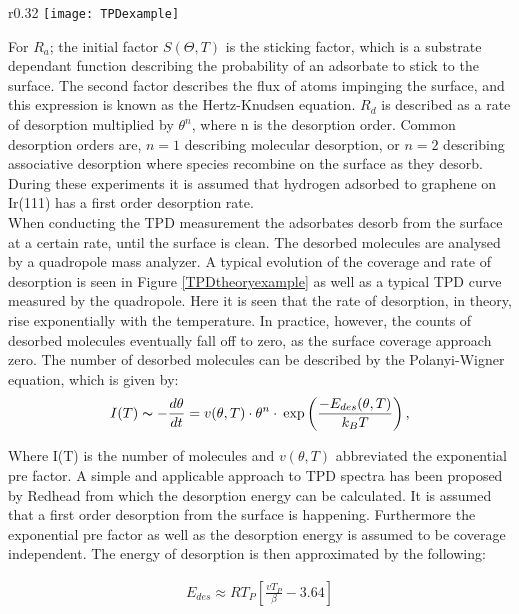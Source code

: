 \begin{wrapfigure}{r}{0.32\textwidth}
  \centering
  \texttt{[image: TPDexample]}
  \caption{Top: Surface coverage and desorption rate. Bottom: Example of TPD curve. \cite{desorpslides}}
  \label{TPDtheoryexample}
\end{wrapfigure}
For $R_a$; the initial factor $S(\Theta ,T)$ is the sticking factor, which is a substrate dependant function describing the probability of an adsorbate to stick to the surface. The second factor describes the flux of atoms impinging the surface, and this expression is known as the Hertz-Knudsen equation. $R_d$ is described as a rate of desorption multiplied by $\theta^n$, where n is the desorption order. Common desorption orders are, $n = 1$ describing molecular desorption, or $n=2$ describing associative desorption where species recombine on the surface as they desorb. During these experiments it is assumed that hydrogen adsorbed to graphene on Ir(111) has a first order desorption rate.\\
When conducting the TPD measurement the adsorbates desorb from the surface at a certain rate, until the surface is clean. The desorbed molecules are analysed by a quadropole mass analyzer. A typical evolution of the coverage and rate of desorption is seen in Figure \ref{TPDtheoryexample} as well as a typical TPD curve measured by the quadropole. Here it is seen that the rate of desorption, in theory, rise exponentially with the temperature. In practice, however, the counts of desorbed molecules eventually fall off to zero, as the surface coverage approach zero. The number of desorbed molecules can be described by the Polanyi-Wigner equation, which is given by: \cite{TPDbog, TPDekstra}
\begin{align}
  I(T) \thicksim - \frac{d\theta}{dt} = v(\theta,T)\cdot \theta^n \cdot \: \text{exp}\left(\frac{-E_{des}(\theta,T)}{k_BT}\right),
\end{align}

Where I(T) is the number of molecules and $v(\theta,T)$ abbreviated the exponential pre factor. A simple and applicable approach to TPD spectra has been proposed by Redhead from which the desorption energy can be calculated.\cite{TPDbog} It is assumed that a first order desorption from the surface is happening. Furthermore the exponential pre factor as well as the desorption energy is assumed to be coverage independent. The energy of desorption is then approximated by the following:\cite{berlinslides}

\begin{align}
E_{des} \approx RT_P \left[ \frac{v T_P}{\beta} - 3.64 \right]
\label{eq:redhead}
\end{align}

